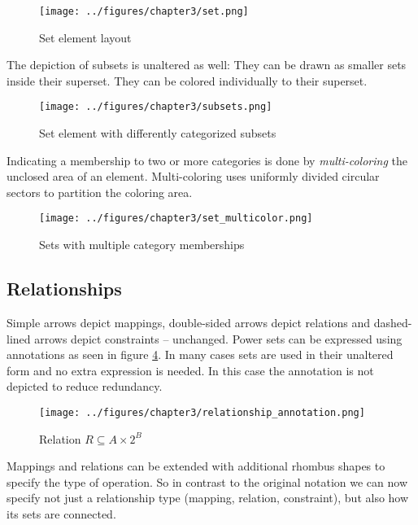 \documentclass[twoside, openright, 12pt]{book}
\begin{document}
\begin{figure}[htb]
	\centering
	\texttt{[image: ../figures/chapter3/set.png]}
	\caption{Set element layout}
	\label{fig:set}
\end{figure}

\noindent
The depiction of subsets is unaltered as well: They can be drawn as smaller sets inside their superset.
They can be colored individually to their superset.

\begin{figure}[htb]
	\centering
	\texttt{[image: ../figures/chapter3/subsets.png]}
	\caption{Set element with differently categorized subsets}
	\label{fig:subsets}
\end{figure}

\noindent
Indicating a membership to two or more categories is done by \textit{multi-coloring} the unclosed area of an element.
Multi-coloring uses uniformly divided circular sectors to partition the coloring area.

\begin{figure}[!h]
	\centering
	\texttt{[image: ../figures/chapter3/set\_multicolor.png]}
	\caption{Sets with multiple category memberships}
	\label{fig:set_multicolor}
\end{figure}



\subsection{Relationships}
\label{relationships}
Simple arrows depict mappings, double-sided arrows depict relations and dashed-lined arrows depict constraints -- unchanged.
Power sets can be expressed using annotations as seen in figure \ref{fig:relationship_annotation}.
In many cases sets are used in their unaltered form and no extra expression is needed.
In this case the annotation is not depicted to reduce redundancy.

\begin{figure}[htb]
	\centering
	\texttt{[image: ../figures/chapter3/relationship\_annotation.png]}
	\caption{Relation $R \subseteq A \times 2^B$}
	\label{fig:relationship_annotation}
\end{figure}

\noindent
Mappings and relations can be extended with additional rhombus shapes to specify the type of operation.
So in contrast to the original notation we can now specify not just a relationship type (mapping, relation, constraint), but also how its sets are connected.
\end{document}
